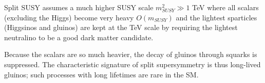 Split SUSY assumes a much higher SUSY scale $m_{SUSY}^2 \gg 1$ TeV where all scalars (excluding the Higgs) 
become very heavy $O(m_{SUSY})$ and the lightest sparticles (Higgsinos and gluinos) are kept at the TeV scale by requiring the lightest neutralino to be a good dark matter candidate. 

Because the scalars are so much heavier, the decay of gluinos through squarks is suppressed.
The characteristic signature of split supersymmetry is thus long-lived gluinos; such processes 
with long lifetimes are rare in the SM.
